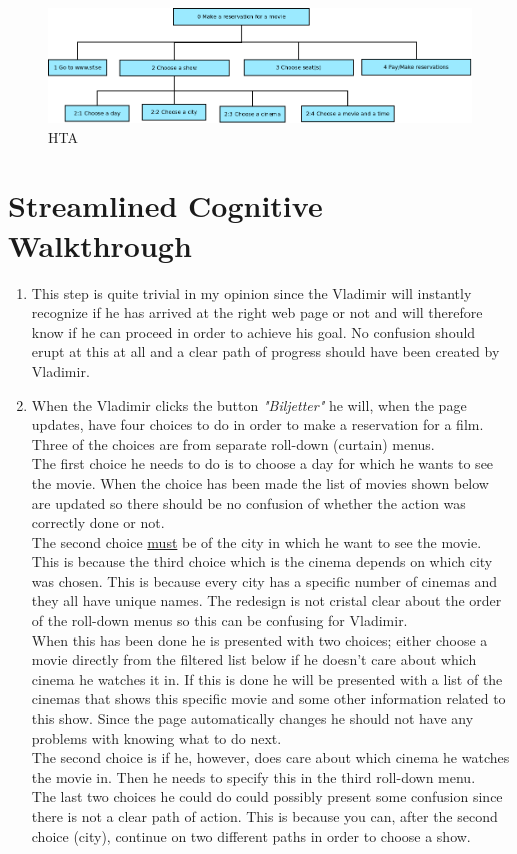 \documentclass[a4paper,11pt]{article}
\begin{document}
\begin{figure}[H]
\centering
\includegraphics[scale=0.5]{Diagram1.png} 
\caption{HTA}
\end{figure}

\newpage
\section{Streamlined Cognitive Walkthrough}

\begin{enumerate}
\item This step is quite trivial in my opinion since the Vladimir will instantly recognize if he has arrived at the right web page or not and will therefore know if he can proceed in order to achieve his goal. No confusion should erupt at this at all and a clear path of progress should have been created by Vladimir.

\item When the Vladimir clicks the button \textit{"Biljetter"} he will, when the page updates, have four choices to do in order to make a reservation for a film. Three of the choices are from separate roll-down (curtain) menus.\\ 
The first choice he needs to do is to choose a day for which he wants to see the movie. When the choice has been made the list of movies shown below are updated so there should be no confusion of whether the action was correctly done or not.\\
The second choice \underline{must} be of the city in which he want to see the movie. This is because the third choice which is the cinema depends on which city was chosen. This is because every city has a specific number of cinemas and they all have unique names. The redesign is not cristal clear about the order of the roll-down menus so this can be confusing for Vladimir.\\
When this has been done he is presented with two choices; either choose a movie directly from the filtered list below if he doesn't care about which cinema he watches it in. If this is done he will be presented with a list of the cinemas that shows this specific movie and some other information related to this show. Since the page automatically changes he should not have any problems with knowing what to do next.\\
The second choice is if he, however, does care about which cinema he watches the movie in. Then he needs to specify this in the third roll-down menu.\\
The last two choices he could do could possibly present some confusion since there is not a clear path of action. This is because you can, after the second choice (city), continue on two different paths in order to choose a show.
 

\end{enumerate}
\end{document}
